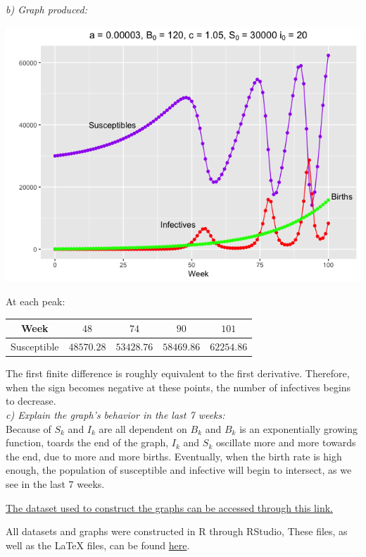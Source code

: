 \documentclass[12pt]{article}
\begin{document}
\break
\textit{b) Graph produced:}
\begin{center}
\includegraphics[width=15cm, ]{question2.png}
\end{center}

\begin{center}
At each peak: $\quad$
\begin{tabular}{ c | c c c c }
Week & $48$  & $74$ & $90$ & $101$\\
\hline
Susceptible & $48570.28$ & $53428.76$ & $58469.86$ & $62254.86$\\
\end{tabular}
\end{center}
The first finite difference is roughly equivalent to the first derivative. Therefore, when the sign becomes negative at these points, the number of infectives begins to decrease.\\


\textit{c) Explain the graph's behavior in the last 7 weeks:}\\
Because of $S_k$ and $I_k$ are all dependent on $B_k$ and $B_k$ is an exponentially growing function, toards the end of the graph, $I_k$ and $S_k$ oscillate more and more towards the end, due to more and more births. Eventually, when the birth rate is high enough, the population of susceptible and infective will begin to intersect, as we see in the last 7 weeks.

\begin{center}
\small \href{https://github.com/chenjoshua7/SIR_model_measles/blob/master/Problem%202/GPS5_Problem2_data.csv}{The dataset used to construct the graphs can be accessed through this link.}\\
\end{center}

\begin{center}
\normalsize All datasets and graphs were constructed in R through RStudio, These files, as well as the LaTeX files, can be found \href{https://github.com/chenjoshua7/SIR_model_measles}{here}.
\end{center}
\end{document}
